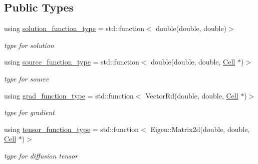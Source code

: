 \subsection*{Public Types}
\begin{DoxyCompactItemize}
\item 
\mbox{\label{classHArDCore2D_1_1BPNC__StefanPME_ad0802f467317597f803c0dd45d26c3ba}} 
using \hyperlink{classHArDCore2D_1_1BPNC__StefanPME_ad0802f467317597f803c0dd45d26c3ba}{solution\+\_\+function\+\_\+type} = std\+::function$<$ double(double, double)$>$
\begin{DoxyCompactList}\small\item\em type for solution \end{DoxyCompactList}\item 
\mbox{\label{classHArDCore2D_1_1BPNC__StefanPME_a233ff438d25c93b72498ce3b461c8623}} 
using \hyperlink{classHArDCore2D_1_1BPNC__StefanPME_a233ff438d25c93b72498ce3b461c8623}{source\+\_\+function\+\_\+type} = std\+::function$<$ double(double, double, \hyperlink{classHArDCore2D_1_1Cell}{Cell} $\ast$)$>$
\begin{DoxyCompactList}\small\item\em type for source \end{DoxyCompactList}\item 
\mbox{\label{classHArDCore2D_1_1BPNC__StefanPME_a33d159dc2e762c21926b85a21e38c5d8}} 
using \hyperlink{classHArDCore2D_1_1BPNC__StefanPME_a33d159dc2e762c21926b85a21e38c5d8}{grad\+\_\+function\+\_\+type} = std\+::function$<$ Vector\+Rd(double, double, \hyperlink{classHArDCore2D_1_1Cell}{Cell} $\ast$)$>$
\begin{DoxyCompactList}\small\item\em type for gradient \end{DoxyCompactList}\item 
\mbox{\label{classHArDCore2D_1_1BPNC__StefanPME_aa07717e39892228c331b3cf3c29b086e}} 
using \hyperlink{classHArDCore2D_1_1BPNC__StefanPME_aa07717e39892228c331b3cf3c29b086e}{tensor\+\_\+function\+\_\+type} = std\+::function$<$ Eigen\+::\+Matrix2d(double, double, \hyperlink{classHArDCore2D_1_1Cell}{Cell} $\ast$)$>$
\begin{DoxyCompactList}\small\item\em type for diffusion tensor \end{DoxyCompactList}\end{DoxyCompactItemize}
